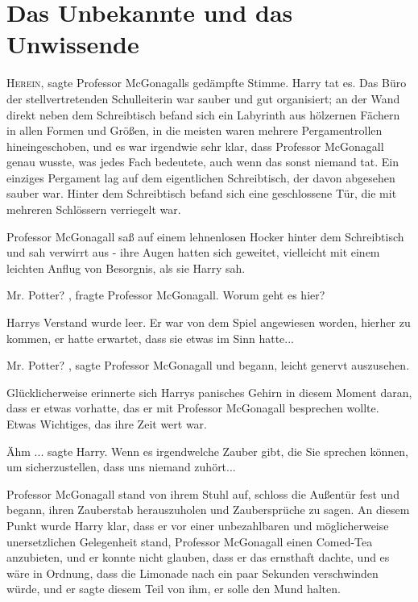 \chapter{Das Unbekannte und das Unwissende}

\lettrine{\glqq H}{erein}\grqq{}, sagte Professor McGonagalls gedämpfte Stimme.
Harry tat es. Das Büro der stellvertretenden Schulleiterin war sauber und gut
organisiert; an der Wand direkt neben dem Schreibtisch befand sich ein Labyrinth
aus hölzernen Fächern in allen Formen und Größen, in die meisten waren mehrere
Pergamentrollen hineingeschoben, und es war irgendwie sehr klar, dass Professor
McGonagall genau wusste, was jedes Fach bedeutete, auch wenn das sonst niemand
tat. Ein einziges Pergament lag auf dem eigentlichen Schreibtisch, der davon
abgesehen sauber war. Hinter dem Schreibtisch befand sich eine geschlossene Tür,
die mit mehreren Schlössern verriegelt war.

Professor McGonagall saß auf einem lehnenlosen Hocker hinter dem Schreibtisch
und sah verwirrt aus - ihre Augen hatten sich geweitet, vielleicht mit einem
leichten Anflug von Besorgnis, als sie Harry sah.

\glqq Mr. Potter?\grqq{} , fragte Professor McGonagall. \glqq Worum geht es
hier?\grqq{}

Harrys Verstand wurde leer. Er war von dem Spiel angewiesen worden, hierher zu
kommen, er hatte erwartet, dass sie etwas im Sinn hatte...

\glqq Mr. Potter?\grqq{} , sagte Professor McGonagall und begann, leicht genervt
auszusehen.

Glücklicherweise erinnerte sich Harrys panisches Gehirn in diesem Moment daran,
dass er etwas vorhatte, das er mit Professor McGonagall besprechen wollte. Etwas
Wichtiges, das ihre Zeit wert war.

\glqq Ähm ...\grqq{} sagte Harry. \glqq Wenn es irgendwelche Zauber gibt, die
Sie sprechen können, um sicherzustellen, dass uns niemand zuhört...\grqq{}

Professor McGonagall stand von ihrem Stuhl auf, schloss die Außentür fest und
begann, ihren Zauberstab herauszuholen und Zaubersprüche zu sagen. An diesem
Punkt wurde Harry klar, dass er vor einer unbezahlbaren und möglicherweise
unersetzlichen Gelegenheit stand, Professor McGonagall einen Comed-Tea
anzubieten, und er konnte nicht glauben, dass er das ernsthaft dachte, und es
wäre in Ordnung, dass die Limonade nach ein paar Sekunden verschwinden würde,
und er sagte diesem Teil von ihm, er solle den Mund halten.

